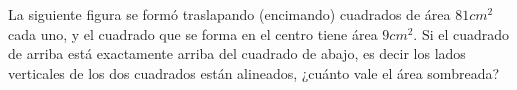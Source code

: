 La siguiente figura se formó traslapando (encimando) cuadrados de área $81cm^2$ cada uno, y el cuadrado que se forma en el centro tiene área $9cm^2$. Si el cuadrado de arriba está exactamente arriba del cuadrado de abajo, es decir los lados verticales de los dos cuadrados están alineados, ¿cuánto vale el área sombreada?